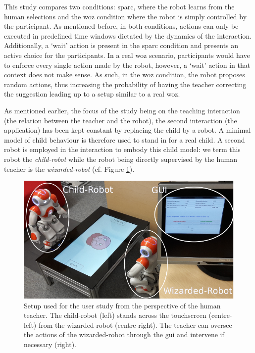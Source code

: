 

This study compares two conditions: \gls{sparc}, where the robot learns from the human selections and the \gls{woz} condition where the robot is simply controlled by the participant. As mentioned before, in both conditions, actions can only be executed in predefined time windows dictated by the dynamics of the interaction. Additionally, a `wait' action is present in the \gls{sparc} condition and presents an active choice for the participants. 
In a real \gls{woz} scenario, participants would have to enforce every single action made by the robot, however, a `wait' action in that context does not make sense. As such, in the \gls{woz} condition, the robot proposes random actions, thus increasing the probability of having the teacher correcting the suggestion leading up to a setup similar to a real \gls{woz}.

As mentioned earlier, the focus of the study being on the teaching interaction (the relation between the teacher and the robot), the second interaction (the application) has been kept constant by replacing the child by a robot. A minimal model of child behaviour is therefore used to stand in for a real child. A second robot is employed in the interaction to embody this child model: we term this robot the \textit{child-robot} while the robot being directly supervised by the human teacher is the \textit{wizarded-robot} (cf. Figure \ref{fig:woz_setup}).

\begin{figure}[ht]
	\centering
	\includegraphics[width=.9\textwidth]{setup_annotated.png}
	\caption{Setup used for the user study from the perspective of the human teacher. The child-robot (left) stands across the touchscreen (centre-left) from the wizarded-robot (centre-right). The teacher can oversee the actions of the wizarded-robot through the \gls{gui} and intervene if necessary (right).}
	\label{fig:woz_setup}
\end{figure}
		
